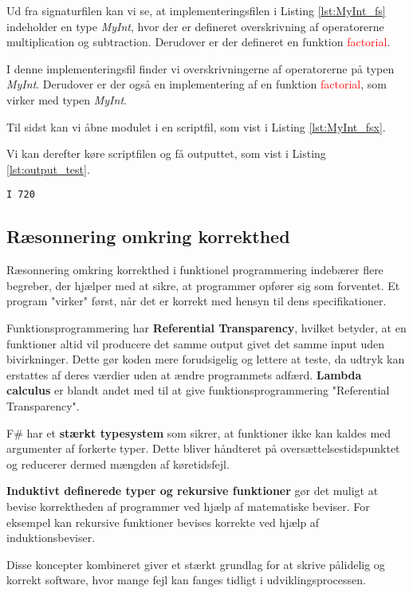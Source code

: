 Ud fra signaturfilen kan vi se, at implementeringsfilen i Listing \ref{lst:MyInt_fs} indeholder en type \textit{MyInt}, hvor der er defineret overskrivning af operatorerne multiplication og subtraction. Derudover er der defineret en funktion \textcolor{red}{factorial}. 



I denne implementeringsfil finder vi overskrivningerne af operatorerne på typen \textit{MyInt}. Derudover er der også en implementering af en funktion \textcolor{red}{factorial}, som virker med typen \textit{MyInt}. 

Til sidst kan vi åbne modulet i en scriptfil, som vist i Listing \ref{lst:MyInt_fsx}.



Vi kan derefter køre scriptfilen og få outputtet, som vist i Listing \ref{lst:output_test}.

\begin{lstlisting}[style=output, label={lst:output_test}, caption={Output ved kørsel af \textit{MyInt.fsx}}]
I 720
\end{lstlisting}

\subsection{Ræsonnering omkring korrekthed}
Ræsonnering omkring korrekthed i funktionel programmering indebærer flere begreber, der hjælper med at sikre, at programmer opfører sig som forventet. Et program "virker" først, når det er korrekt med hensyn til dens specifikationer.

Funktionsprogrammering har \textbf{Referential Transparency}, hvilket betyder, at en funktioner altid vil producere det samme output givet det samme input uden bivirkninger. Dette gør koden mere forudsigelig og lettere at teste, da udtryk kan erstattes af deres værdier uden at ændre programmets adfærd. \textbf{Lambda calculus} er blandt andet med til at give funktionsprogrammering "Referential Transparency".

F\# har et \textbf{stærkt typesystem} som sikrer, at funktioner ikke kan kaldes med argumenter af forkerte typer. Dette bliver håndteret på oversættelsestidspunktet og reducerer dermed mængden af køretidsfejl.

\textbf{Induktivt definerede typer og rekursive funktioner} gør det muligt at bevise korrektheden af programmer ved hjælp af matematiske beviser. For eksempel kan rekursive funktioner bevises korrekte ved hjælp af induktionsbeviser.

Disse koncepter kombineret giver et stærkt grundlag for at skrive pålidelig og korrekt software, hvor mange fejl kan fanges tidligt i udviklingsprocessen.



